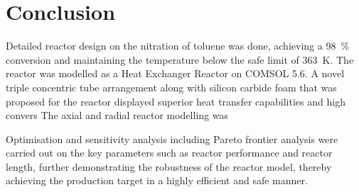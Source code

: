 \section{Conclusion} \label{sec:conclusion}
Detailed reactor design on the nitration of toluene was done, achieving a \SI{98}{\%} conversion and maintaining the temperature below the safe limit of \SI{363}{\K}. The reactor was modelled as a Heat Exchanger Reactor on COMSOL 5.6. A novel triple concentric tube arrangement along with silicon carbide foam that was proposed for the reactor displayed superior heat transfer capabilities and high convers
The axial and radial reactor modelling was 

Optimisation and sensitivity analysis including Pareto frontier analysis were carried out on the key parameters such as reactor performance and reactor length, further demonstrating the robustness of the reactor model, thereby achieving the production target in a highly efficient and safe manner.  

